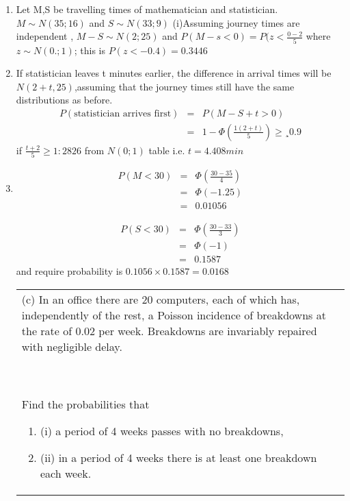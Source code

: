 \documentclass[a4paper,12pt]{article}
\begin{document}
\begin{enumerate}
\begin{table}[ht!]
\begin{tabular}{|p{15cm}|}
 \\ \hline
      \end{tabular}
    \end{table}
\item Let M,S be travelling times of mathematician and statistician.
$M \sim N(35; 16)$ and $S \sim N(33; 9)$
(i)Assuming journey times are independent ,
$M - S \sim N(2; 25)$ and $P(M - s < 0) = P(z <
\frac{0 - 2}{5}$
where $z \sim N(0.; 1)$; this is $P(z < -0.4) = 0.3446$
\item If statistician leaves t minutes earlier, the difference in arrival times will be $N(2+t,25)$,assuming
that the journey times still have the same distributions as before.
\begin{eqnarray*}
P(\mbox{statistician arrives first}) &=& P(M - S + t > 0)\\
&=& 1 - \Phi \left(\frac{1(2+t)}{5} \right) \geq¸ 0.9 
\end{eqnarray*}
if
$ \frac{t + 2}{5} \geq 1:2826$ from $N(0; 1)$ table i.e. $t = 4.408 min$
\item
\begin{eqnarray*}
P(M < 30) &=& \Phi \left( \frac{30-35}{4} \right) 
 \\ &=& \Phi(-1.25)\\ &=& 0.01056
\end{eqnarray*}

\begin{eqnarray*}
P(S < 30)  &=&  \Phi \left( \frac{30-33}{3} \right) \\ &=&  \Phi(-1) \\ &=&  0.1587
\end{eqnarray*}
and require probability is $0.1056 \times 0.1587 = 0.0168$

\newpage
  \begin{table}[ht!]
     \centering
     \begin{tabular}{|p{15cm}|}
     \hline  
     \large
(c) In an office there are 20 computers, each of which has, independently of the rest, a Poisson incidence of breakdowns at the rate of 0.02 per week.  Breakdowns are invariably repaired with negligible delay.\\\

\medskip Find the probabilities that 
 
\begin{enumerate}
\item (i) a period of 4 weeks passes with no breakdowns, 
\item (ii) in a period of 4 weeks there is at least one breakdown each week. 
\end{enumerate}


\end{tabular}
\end{table}
\end{enumerate}
\end{document}
